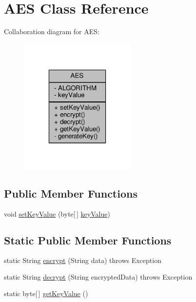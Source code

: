 \hypertarget{a00001}{\section{A\+E\+S Class Reference}
\label{a00001}
}


Collaboration diagram for A\+E\+S\+:
\nopagebreak
\begin{figure}[H]
\begin{center}
\leavevmode
\includegraphics[width=166pt]{a00067}
\end{center}
\end{figure}
\subsection*{Public Member Functions}
\begin{DoxyCompactItemize}
\item 
void \hyperlink{a00001_adac98388bd7c0bf94c3ac2c1987e3f14}{set\+Key\+Value} (byte\mbox{[}$\,$\mbox{]} \hyperlink{a00001_a1a9da325d5376125b139a98e7ff9d2e2}{key\+Value})
\end{DoxyCompactItemize}
\subsection*{Static Public Member Functions}
\begin{DoxyCompactItemize}
\item 
static String \hyperlink{a00001_a4961b27ef3efa77d9ed11ebadffe2c9b}{encrypt} (String data)  throws Exception 
\item 
static String \hyperlink{a00001_a3b7b86cb0a160857d40bd2145364f194}{decrypt} (String encrypted\+Data)  throws Exception 
\item 
static byte\mbox{[}$\,$\mbox{]} \hyperlink{a00001_a2ac0845b551e7ebd2bf47e1beac6df48}{get\+Key\+Value} ()
\end{DoxyCompactItemize}
